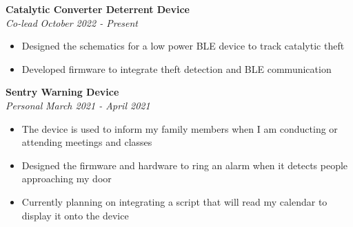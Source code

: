 \documentclass[a4paper,20pt]{article}
\begin{document}
    \vspace{-1pt}
        \textbf{Catalytic Converter Deterrent Device} \\
        \textit{Co-lead} \hspace{13.25cm}
        \textit{October 2022 - Present}
        \vspace{-6pt}
    \begin{itemize} %
        \item Designed the schematics for a low power BLE device to track catalytic theft \vspace{-5pt}
        \item Developed firmware to integrate theft detection and BLE communication 
    \end{itemize}
    \vspace{-1pt}
        \textbf{Sentry Warning Device} \\
        \textit{Personal} \hspace{12.8cm}
        \textit{March 2021 - April 2021}
        \vspace{-6pt}
    \begin{itemize}
        \item The device is used to inform my family members when I am conducting or attending meetings and classes \vspace{-5pt}
        \item Designed the firmware and hardware to ring an alarm when it detects people approaching my door \vspace{-5pt}
        \item Currently planning on integrating a script that will read my calendar to display it onto the device
    \end{itemize}
\end{document}
